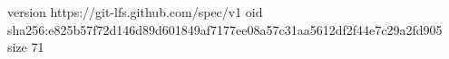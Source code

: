 version https://git-lfs.github.com/spec/v1
oid sha256:e825b57f72d146d89d601849af7177ee08a57c31aa5612df2f44e7c29a2fd905
size 71
